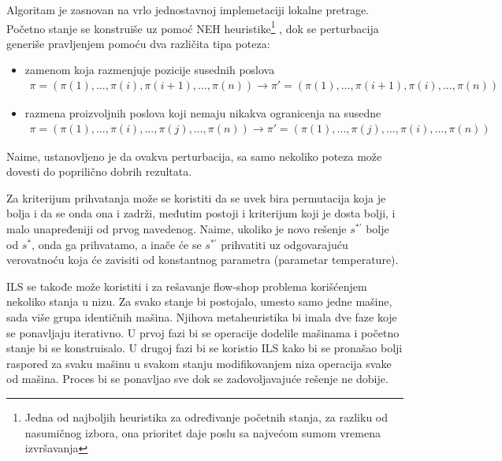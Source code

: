\documentclass[a4paper]{article}
\newcommand{\sstar}[0]{$\textit{s}^*$}
\begin{document}
Algoritam je zasnovan na vrlo jednostavnoj implemetaciji lokalne pretrage. Početno stanje se konstruiše uz pomoć NEH heuristike\footnote{Jedna od najboljih heuristika za određivanje početnih stanja, za razliku od nasumičnog izbora, ona prioritet daje poslu sa najvećom sumom vremena izvršavanja }
, dok se perturbacija generiše pravljenjem pomoću dva različita tipa poteza:
\begin{itemize}
  \item zamenom koja razmenjuje pozicije susednih poslova \\
	\begin{gather*}
	 \pi = (\pi(1),..., \pi(i), \pi(i+1),..., \pi(n)) \rightarrow \pi\prime =  ( \pi(1),...,  \pi(i+1),  \pi(i),...,  \pi(n))
	\end{gather*}
  \item razmena proizvoljnih poslova koji nemaju nikakva ogranicenja na susedne \\
	\begin{gather*}
	 \pi = (\pi(1),..., \pi(i),..., \pi(j),..., \pi(n)) \rightarrow \pi\prime =  ( \pi(1),...,  \pi(j),...,  \pi(i),...,  \pi(n))
	\end{gather*}
\end{itemize}
Naime, ustanovljeno je da ovakva perturbacija, sa samo nekoliko poteza može dovesti do poprilično dobrih rezultata.


Za kriterijum prihvatanja može se koristiti da se uvek bira permutacija koja je bolja i da se onda ona i zadrži, međutim postoji i kriterijum koji je dosta bolji, i malo unapređeniji od prvog navedenog. Naime, ukoliko je novo rešenje $\textit{s}^{*\prime}$ bolje od \sstar{}, onda ga prihvatamo, a inače će se $\textit{s}^{*\prime}$ prihvatiti uz odgovarajuću verovatnoću
koja će zavisiti od konstantnog parametra  (parametar temperature).

ILS se takođe može koristiti i za rešavanje flow-shop problema korišćenjem nekoliko stanja u nizu. Za svako stanje bi postojalo, umesto samo jedne mašine, sada više grupa identičnih mašina. Njihova metaheuristika bi imala dve faze koje se ponavljaju iterativno. U prvoj fazi bi se operacije dodelile mašinama i početno stanje bi se konstruisalo. U drugoj fazi bi se koristio ILS kako bi se pronašao bolji raspored za svaku mašinu u svakom stanju modifikovanjem niza operacija svake od mašina. Proces bi se ponavljao sve dok se zadovoljavajuće rešenje ne dobije. \cite{applyingIteratedLocalSearchtothePermutation,handbookOfMetaheuristics} 
\end{document}
